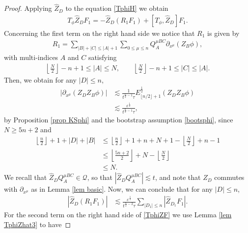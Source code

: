 \documentclass{article}
\newcommand{\cQ}{{\mathcal Q}}
\begin{document}
\begin{proof}
Applying $ \hat{ Z }_D $ to the equation \eqref{TphiH} we obtain
\begin{align}
T_\phi \hat{ Z }_D F_1 = - \hat{ Z }_D \left( R_1 F_1 \right) + \left[ T_\phi , \hat{ Z }_D \right] F_1 . \label{TphiZF}
\end{align}
Concerning the first term on the right hand side we notice that $ R_1 $ is given by
\begin{align*}
R_1 = \sum_{ | B | + | C | \leq | A | + 1 } \sum_{ 0 \leq \mu \leq n } Q^{ \mu B C }_{ A } \partial_{ x^\mu } ( Z_B \phi ) ,
\end{align*}
with multi-indices $ A $ and $ C $ satisfying
\begin{align*}
\left\lfloor \frac{ N }{ 2 } \right\rfloor - n +1 \leq | A | \leq N , \qquad \left\lfloor \frac{ N }{ 2 } \right\rfloor - n +1 \leq | C | \leq | A | .
\end{align*}
Then, we obtain for any $ | D | \leq n $,
\begin{align*}
| \partial_{ x^\mu } ( Z_{ D } Z_B \phi ) | & \lesssim \frac{ 1 }{ t^{ \frac{ n }{ 2 } - 1 } \tau } E_{ \lfloor n / 2 \rfloor + 1 }^{ \frac12 } ( Z_{ D } Z_B \phi ) \\
& \lesssim \frac{ \varepsilon^{ \frac{ 1 }{ 2 } } }{ t^{ \frac{ n }{ 2 } - 1 } \tau } ,
\end{align*}
by Proposition \ref{prop KSphi} and the bootstrap assumption \eqref{bootsphi}, since $ N \geq 5 n + 2 $ and
\begin{align*}
\left\lfloor \frac{ n }{ 2 } \right\rfloor + 1 + | D | + | B | & \leq \left\lfloor \frac{ n }{ 2 } \right\rfloor + 1 + n + N + 1 - \left\lfloor \frac{ N }{ 2 } \right\rfloor + n - 1 \\
& \leq \left\lfloor \frac{ 5 n + 2 }{ 2 } \right\rfloor + N - \left\lfloor \frac{ N }{ 2 } \right\rfloor \\
& \leq N .
\end{align*}
We recall that $ \hat{ Z }_{ D } Q^{ \mu B C }_{ A } \in \cQ $, so that $ | \hat{ Z }_{ D } Q^{ \mu B C }_{ A } | \lesssim t $, and note that $ Z_{ D } $ commutes with $ \partial_{ x^\mu } $ as in Lemma \ref{lem basic}. Now, we can conclude that for any $ | D | \leq n $,
\begin{align*}
| \hat{ Z }_D ( R_1 F_1 ) | & \lesssim \frac{ \varepsilon^{ \frac{ 1 }{ 2 } } }{ t^{ \frac{ n }{ 2 } - 2 } \tau } \sum_{ | D_1 | \leq n } | \hat{ Z }_{ D_1 } F_1 | .
\end{align*}
For the second term on the right hand side of \eqref{TphiZF} we use Lemma \ref{lem TphiZhat3} to have

\end{proof}
\end{document}
